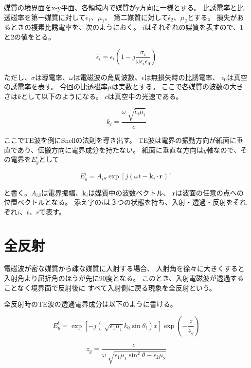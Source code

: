 \documentclass[a4paper,11pt]{jsarticle}
\begin{document}
媒質の境界面をx-y平面、各領域内で媒質がy方向に一様とする。
比誘電率と比透磁率を第一媒質に対して$\dot{\epsilon_1}$、$\mu_1$、
第二媒質に対して$\dot{\epsilon_2}$、$\mu_2$とする。
損失があるときの複素比誘電率を、次のようにおく。
$i$はそれぞれの媒質を表すので、1と2の値をとる。

\begin{equation}
  \dot{\epsilon_i} = \epsilon_i(1 - j\frac{\sigma_i}{\omega\epsilon_i\epsilon_0})
\end{equation}

ただし、$\sigma$は導電率、$\omega$は電磁波の角周波数、$\epsilon$は無損失時の比誘電率、
$\epsilon_0$は真空の誘電率を表す。
今回の比透磁率$\mu$は実数とする。
ここで各媒質の波数の大きさは$k$として以下のようになる。
$c$は真空中の光速である。

\begin{equation}
  k_i = \frac{\omega\sqrt[]{\dot{\epsilon_i}\mu_i}}{c}
\end{equation}

ここでTE波を例にSnellの法則を導き出す。
TE波は電界の振動方向が紙面に垂直であり、伝搬方向に電界成分を持たない。
紙面に垂直な方向は$y$軸なので、その電界を$E^i_y$として

\begin{equation}
  E^i_y = A_{iS}\exp[j(\omega t - \boldsymbol{k}_i\cdot\boldsymbol{r})]
\end{equation}

と書く。$A_{iS}$は電界振幅、$\boldsymbol{k}_i$は媒質中の波数ベクトル、
$\boldsymbol{r}$は波面の任意の点への位置ベクトルとなる。
添え字の$i$は３つの状態を持ち、入射・透過・反射をそれぞれ$i$、$t$、$r$で表す。

\section{全反射}

電磁波が密な媒質から疎な媒質に入射する場合、
入射角を徐々に大きくすると入射角より屈折角のほうが先に90度となる。
このとき、入射電磁波が透過することなく境界面で反射後に
すべて入射側に戻る現象を全反射という。

全反射時のTE波の透過電界成分は以下のように書ける。

\begin{equation}
  E^t_y = \exp[-j(\sqrt[]{\epsilon_1\mu_1}k_0\sin\theta_t)x]\exp\left(-\frac{z}{z_g}\right)
\end{equation}

\begin{equation}
  z_g = \frac{c}{\omega\sqrt[]{\epsilon_1\mu_1\sin^{2}\theta - \epsilon_2\mu_2}}
\end{equation}
\end{document}
